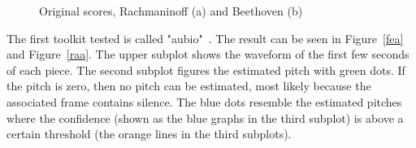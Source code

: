 \begin{figure}[htbp]
	\centering
	\caption{Original scores, Rachmaninoff (a) and Beethoven (b)}
	\label{fig:sheets}
\end{figure}
The first toolkit tested is called "aubio"~\cite{aubio1}. The result can be seen in Figure~\ref{fea} and Figure~\ref{raa}. The upper subplot shows the waveform of the first few seconds of each piece. The second subplot figures the estimated pitch with green dots. If the pitch is zero, then no pitch can be estimated, most likely because the associated frame contains silence. The blue dots resemble the estimated pitches where the confidence (shown as the blue graphs in the third subplot) is above a certain threshold (the orange lines in the third subplots).
